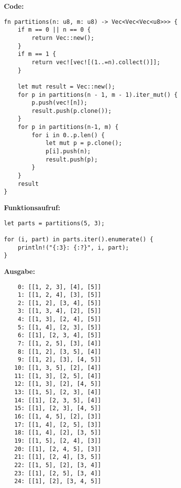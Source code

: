 \documentclass[a4paper]{scrartcl}
\begin{document}
\textbf{Code:}
\begin{lstlisting}
fn partitions(n: u8, m: u8) -> Vec<Vec<Vec<u8>>> {
    if m == 0 || n == 0 {
        return Vec::new();
    }
    if m == 1 {
        return vec![vec![(1..=n).collect()]];
    }

    let mut result = Vec::new();
    for p in partitions(n - 1, m - 1).iter_mut() {
        p.push(vec![n]);
        result.push(p.clone());
    }
    for p in partitions(n-1, m) {
        for i in 0..p.len() {
            let mut p = p.clone();
            p[i].push(n);
            result.push(p);
        }
    }
    result
}
\end{lstlisting}

\textbf{Funktionsaufruf:}
\begin{lstlisting}
let parts = partitions(5, 3);

for (i, part) in parts.iter().enumerate() {
    println!("{:3}: {:?}", i, part);    
}
\end{lstlisting}

\textbf{Ausgabe:}
\begin{lstlisting}
    0: [[1, 2, 3], [4], [5]]
    1: [[1, 2, 4], [3], [5]]
    2: [[1, 2], [3, 4], [5]]
    3: [[1, 3, 4], [2], [5]]
    4: [[1, 3], [2, 4], [5]]
    5: [[1, 4], [2, 3], [5]]
    6: [[1], [2, 3, 4], [5]]
    7: [[1, 2, 5], [3], [4]]
    8: [[1, 2], [3, 5], [4]]
    9: [[1, 2], [3], [4, 5]]
   10: [[1, 3, 5], [2], [4]]
   11: [[1, 3], [2, 5], [4]]
   12: [[1, 3], [2], [4, 5]]
   13: [[1, 5], [2, 3], [4]]
   14: [[1], [2, 3, 5], [4]]
   15: [[1], [2, 3], [4, 5]]
   16: [[1, 4, 5], [2], [3]]
   17: [[1, 4], [2, 5], [3]]
   18: [[1, 4], [2], [3, 5]]
   19: [[1, 5], [2, 4], [3]]
   20: [[1], [2, 4, 5], [3]]
   21: [[1], [2, 4], [3, 5]]
   22: [[1, 5], [2], [3, 4]]
   23: [[1], [2, 5], [3, 4]]
   24: [[1], [2], [3, 4, 5]]
\end{lstlisting}
\end{document}
